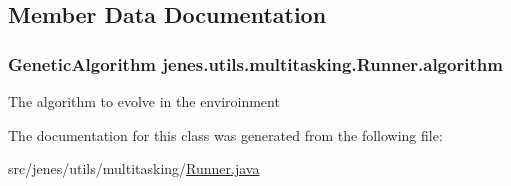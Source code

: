 \subsection{Member Data Documentation}
\hypertarget{classjenes_1_1utils_1_1multitasking_1_1_runner_a699ccf526b6116f97abc09e4ce390c89}{
\subsubsection[{algorithm}]{\setlength{\rightskip}{0pt plus 5cm}Genetic\-Algorithm jenes.\-utils.\-multitasking.\-Runner.\-algorithm\hspace{0.3cm}{\ttfamily [protected]}}}\label{classjenes_1_1utils_1_1multitasking_1_1_runner_a699ccf526b6116f97abc09e4ce390c89}
The algorithm to evolve in the enviroinment 

The documentation for this class was generated from the following file\-:\begin{DoxyCompactItemize}
\item 
src/jenes/utils/multitasking/\hyperlink{_runner_8java}{Runner.\-java}\end{DoxyCompactItemize}
